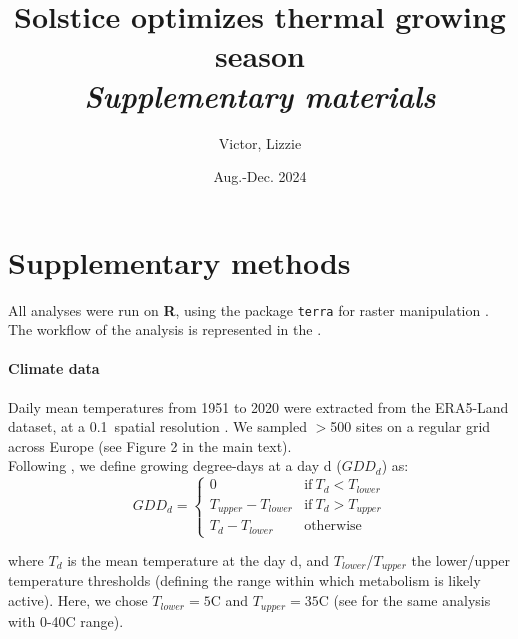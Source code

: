 \documentclass[11pt,letter]{article}
\title{Solstice optimizes thermal growing season\\\emph{Supplementary materials}}
\author{Victor, Lizzie}
\date{Aug.-Dec. 2024}
\begin{document}
\maketitle

\section*{Supplementary methods}

All analyses were run on \textbf{\textsf{R}}, using the package \texttt{terra} for raster manipulation \citep{Hijmans2024}. The workflow of the analysis is represented in the .

\paragraph{Climate data}
Daily mean temperatures from 1951 to 2020 were extracted from the ERA5-Land dataset, at a 0.1\degree~spatial resolution \citep{MunozSabater2021}. We sampled $>$500 sites on a regular grid across Europe (see Figure 2 in the main text).\\
Following \citet{McMaster1997}, we define growing degree-days at a day d ($GDD_d$) as:
\begin{equation}
GDD_d =
\begin{cases}
    0 & \text{if}~T_d<T_{lower}\\
    T_{upper}-T_{lower} & \text{if}~T_d>T_{upper}\\
    T_d-T_{lower} & \text{otherwise}
\end{cases}       
\end{equation}

\noindent where $T_d$ is the mean temperature at the day d, and $T_{lower}$/$T_{upper}$ the lower/upper temperature thresholds (defining the range within which metabolism is likely active). Here, we chose $T_{lower}=5$\degree C and $T_{upper}=35$\degree C (see  for the same analysis with 0-40\degree C range). 
\end{document}
